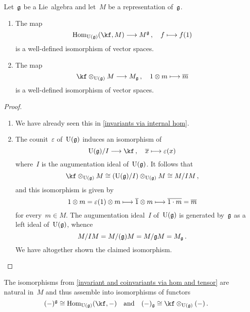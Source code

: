 \begin{proposition}
	\label{invariant and coinvariants via hom and tensor}
	Let~$\mathfrak{g}$ be a Lie~algebra and let~$M$ be a representation of~$\mathfrak{g}$.
	\begin{enumerate}
		\item
			The map
			\[
				\Hom_{\Univ(\glie)}(\kf, M)
				\to
				M^{\glie} \,,
				\quad
				f
				\mapsto
				f(1)
			\]
			is a well-defined isomorphism of vector spaces.
		\item
			The map
			\[
				\kf \otimes_{\Univ(\glie)} M
				\to
				M_{\glie} \,,
				\quad
				1 \otimes m
				\mapsto
				\class{ m }
			\]
			is a well-defined isomorphism of vector spaces.
	\end{enumerate}
\end{proposition}


\begin{proof}
	\leavevmode
	\begin{enumerate}
		\item
			We have already seen this in \cref{invariants via internal hom}.
		\item
			The counit~$\varepsilon$ of~$\Univ(\glie)$ induces an isomorphism of~\module{$\Univ(\glie)$}
			\[
				\Univ(\glie) / I
				\to
				\kf \,,
				\quad
				\class{x}
				\mapsto
				\varepsilon(x)
			\]
			where~$I$ is the augumentation ideal of~$\Univ(\glie)$.
			It follows that
			\[
				\kf \otimes_{\Univ(\glie)} M
				\cong
				( \Univ(\glie) / I ) \otimes_{\Univ(\glie)} M
				\cong
				M / I M \,,
			\]
			and this isomorphism is given by
			\[
				1 \otimes m
				=
				\varepsilon(1) \otimes m
				\mapsto
				\class{1} \otimes m
				\mapsto
				\class{ 1 \cdot m }
				=
				\class{ m }
			\]
			for every~$m \in M$.
			The augumentation ideal~$I$ of~$\Univ(\glie)$ is generated by~$\mathfrak{g}$ as a left ideal of~$\Univ(\glie)$, whence
			\[
				M / I M
				=
				M / \lparen\mathfrak{g}\rparen M
				=
				M / \mathfrak{g} M
				=
				M_{\mathfrak{g}} \,.
			\]
			We have altogether shown the claimed isomorphism.
		\qedhere
	\end{enumerate}
\end{proof}


\begin{remark}
	\label{invariants and coinvariants via hom and tensor as functors}
	The isomorphisms from \cref{invariant and coinvariants via hom and tensor} are natural in~$M$ and thus assemble into isomorphisms of functors
	\[
		(\ph)^{\glie}
		\cong
		\Hom_{\Univ(\glie)}( \kf, - )
		\quad\text{and}\quad
		(\ph)_{\glie}
		\cong
		\kf \otimes_{\Univ(\glie)} (\ph) \,.
	\]
\end{remark}


